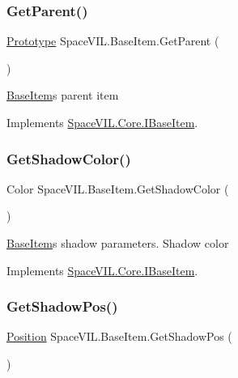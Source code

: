 \subsubsection{\texorpdfstring{Get\+Parent()}{GetParent()}}
{\footnotesize\ttfamily \mbox{\hyperlink{class_space_v_i_l_1_1_prototype}{Prototype}} Space\+V\+I\+L.\+Base\+Item.\+Get\+Parent (\begin{DoxyParamCaption}{ }\end{DoxyParamCaption})}



\mbox{\hyperlink{class_space_v_i_l_1_1_base_item}{Base\+Item}}\textquotesingle{}s parent item 



Implements \mbox{\hyperlink{interface_space_v_i_l_1_1_core_1_1_i_base_item}{Space\+V\+I\+L.\+Core.\+I\+Base\+Item}}.

\mbox{\label{class_space_v_i_l_1_1_base_item_a9130d928ceb471b497f3a73e0c5574b1}} 
\subsubsection{\texorpdfstring{Get\+Shadow\+Color()}{GetShadowColor()}}
{\footnotesize\ttfamily Color Space\+V\+I\+L.\+Base\+Item.\+Get\+Shadow\+Color (\begin{DoxyParamCaption}{ }\end{DoxyParamCaption})}



\mbox{\hyperlink{class_space_v_i_l_1_1_base_item}{Base\+Item}}\textquotesingle{}s shadow parameters. Shadow color 



Implements \mbox{\hyperlink{interface_space_v_i_l_1_1_core_1_1_i_base_item}{Space\+V\+I\+L.\+Core.\+I\+Base\+Item}}.

\mbox{\label{class_space_v_i_l_1_1_base_item_ab51a153da9449f9d8f24e84f31148830}} 
\subsubsection{\texorpdfstring{Get\+Shadow\+Pos()}{GetShadowPos()}}
{\footnotesize\ttfamily \mbox{\hyperlink{class_space_v_i_l_1_1_core_1_1_position}{Position}} Space\+V\+I\+L.\+Base\+Item.\+Get\+Shadow\+Pos (\begin{DoxyParamCaption}{ }\end{DoxyParamCaption})}



